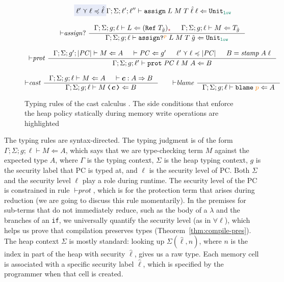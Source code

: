 \begin{figure}[tbp]
{\begin{gather*}
{               \highlightblue{\ell' \curlyvee \ell \preccurlyeq \hat{\ell}} }
              {\Gamma; \Sigma; \ell'; \ell'' \vdash \ccassign{L}{M}{T}{\hat{\ell}}{\ell} \Leftarrow \Unit_{\low}}
    \\[2ex]
    {\vdash}\mathit{assign?} ~
    \inference{\Gamma; \Sigma; g; \ell \vdash L \Leftarrow (\Refer{T_{\hat{g}}})_{\unk} &
               \Gamma; \Sigma; g; \ell \vdash M \Leftarrow T_{\hat{g}}}
              {\Gamma; \Sigma; g; \ell \vdash \ccassignproj{L}{M}{T}{\hat{g}}{p} \Leftarrow \Unit_{\low}}
    \\[2ex]
    {\vdash}\mathit{prot} ~
    \inference{\Gamma; \Sigma; g'; | \PC | \vdash M \Leftarrow A &
               \vdash \PC \Leftarrow g' &
               \ell' \curlyvee \ell \preccurlyeq | \PC | &
               B = \mathit{stamp} \; A \; \ell}
              {\Gamma; \Sigma; g; \ell' \vdash \ccprot{\PC}{\ell}{M}{A} \Leftarrow B}
    \\[2ex]
    {\vdash}\mathit{cast} ~
    \inference{\Gamma; \Sigma; g; \ell \vdash M \Leftarrow A & \vdash \bm{c} : A \Rightarrow B}
              {\Gamma; \Sigma; g; \ell \vdash \cccast{M}{\bm{c}} \Leftarrow B}
    \qquad
    {\vdash}\mathit{blame} ~
    \inference{}
              {\Gamma; \Sigma; g; \ell \vdash \blame{p} \Leftarrow A}
  \end{gather*}}
  \caption{Typing rules of the cast calculus \CC. The side conditions that enforce the
  heap policy statically during memory write operations are highlighted}
  \label{fig:cc-typing-full}
\end{figure}

The typing rules are syntax-directed.  The typing judgment is of the
form $\Gamma ; \Sigma ; g ; \ell \vdash M \Leftarrow A$, which says
that we are type-checking \CC term $M$ against the expected type $A$,
where $\Gamma$ is the typing context, $\Sigma$ is the heap typing
context, $g$ is the security label that PC is typed at, and $\ell$ is
the security level of PC.  Both $\Sigma$ and the security level $\ell$
play a role during runtime.  The security level of the PC is constrained in
rule ${\vdash}\textit{prot}$, which is for the protection term that
arises during reduction (we are going to discuss this rule momentarily).
In the premises for sub-terms that do not immediately
reduce, such as the body of a $\lambda$ and the branches of an
\texttt{if}, we universally quantify the security level (as in
$\forall \ell$), which helps us prove that
compilation preserves types (Theorem~\ref{thm:compile-pres}).  The heap
context $\Sigma$ is mostly standard: looking up
$\Sigma(\hat{\ell}, n)$, where $n$ is the index in part of the heap
with security $\hat{\ell}$, gives us a raw type. Each memory cell is
associated with a specific security label $\hat{\ell}$, which is
specified by the programmer when that cell is
created.

